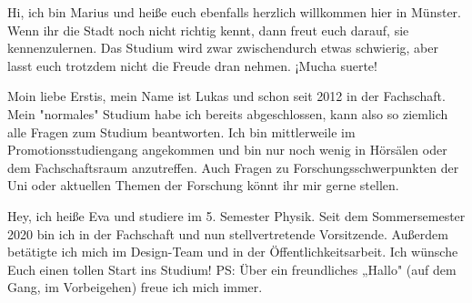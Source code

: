 \begin{multicols}{2}
{
Hi, ich bin Marius und heiße euch ebenfalls herzlich willkommen hier in Münster. Wenn ihr die Stadt noch nicht richtig kennt, dann freut euch darauf, sie kennenzulernen. 
Das Studium wird zwar zwischendurch etwas schwierig, aber lasst euch trotzdem nicht die Freude dran nehmen. ¡Mucha suerte!
}


{
Moin liebe Erstis, mein Name ist Lukas und schon seit 2012 in der Fachschaft. Mein "normales" Studium habe ich bereits abgeschlossen, kann also so ziemlich alle Fragen zum Studium beantworten.
Ich bin mittlerweile im Promotionsstudiengang angekommen und bin nur noch wenig in Hörsälen oder dem Fachschaftsraum anzutreffen.
Auch Fragen zu Forschungsschwerpunkten der Uni oder aktuellen Themen der Forschung könnt ihr mir gerne stellen.
}


{
Hey, ich heiße Eva und studiere im 5. Semester Physik. Seit dem Sommersemester 2020 bin ich in der Fachschaft und nun stellvertretende Vorsitzende. Außerdem betätigte ich mich im Design-Team und in der Öffentlichkeitsarbeit. 
Ich wünsche Euch einen tollen Start ins Studium! PS: Über ein freundliches „Hallo" (auf dem Gang, im Vorbeigehen) freue ich mich immer.
} 



\end{multicols}
